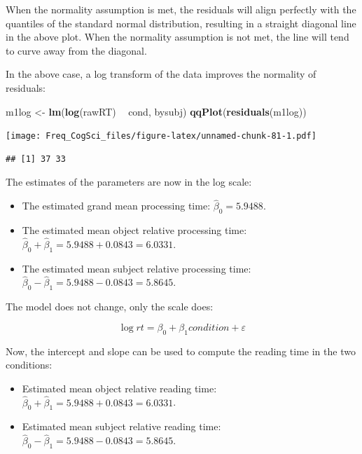 \documentclass[12pt,]{krantz}
\newenvironment{Shaded}{\begin{snugshade}}{\end{snugshade}}
\newcommand{\KeywordTok}[1]{\textcolor[rgb]{0.13,0.29,0.53}{\textbf{#1}}}
\newcommand{\NormalTok}[1]{#1}
\newcommand{\OperatorTok}[1]{\textcolor[rgb]{0.81,0.36,0.00}{\textbf{#1}}}
\newcommand{\StringTok}[1]{\textcolor[rgb]{0.31,0.60,0.02}{#1}}
\providecommand{\tightlist}{%
  \setlength{\itemsep}{0pt}\setlength{\parskip}{0pt}}
\begin{document}
When the normality assumption is met, the residuals will align perfectly with the quantiles of the standard normal distribution, resulting in a straight diagonal line in the above plot. When the normality assumption is not met, the line will tend to curve away from the diagonal.

In the above case, a log transform of the data improves the normality of residuals:

\begin{Shaded}
\begin{Highlighting}[]
\NormalTok{m1log <-}\StringTok{ }\KeywordTok{lm}\NormalTok{(}\KeywordTok{log}\NormalTok{(rawRT) }\OperatorTok{~}\StringTok{ }\NormalTok{cond, bysubj)}
\KeywordTok{qqPlot}\NormalTok{(}\KeywordTok{residuals}\NormalTok{(m1log))}
\end{Highlighting}
\end{Shaded}

\texttt{[image: Freq\_CogSci\_files/figure-latex/unnamed-chunk-81-1.pdf]}

\begin{verbatim}
## [1] 37 33
\end{verbatim}

The estimates of the parameters are now in the log scale:

\begin{itemize}
\tightlist
\item
  The estimated grand mean processing time: \(\hat\beta_0=5.9488\).
\item
  The estimated mean object relative processing time: \(\hat\beta_0+\hat\beta_1=5.9488+0.0843=6.0331\).
\item
  The estimated mean subject relative processing time: \(\hat\beta_0-\hat\beta_1=5.9488-0.0843=5.8645\).
\end{itemize}

The model does not change, only the scale does:

\begin{equation}
\log rt = \beta_0 + \beta_1 condition  + \varepsilon 
\end{equation}

Now, the intercept and slope can be used to compute the reading time in the two conditions:

\begin{itemize}
\tightlist
\item
  Estimated mean object relative reading time: \(\hat\beta_0+\hat\beta_1=5.9488+0.0843=6.0331\).
\item
  Estimated mean subject relative reading time: \(\hat\beta_0-\hat\beta_1=5.9488-0.0843=5.8645\).
\end{itemize}
\end{document}
